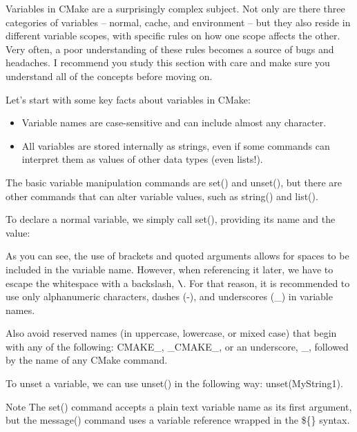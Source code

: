 
Variables in CMake are a surprisingly complex subject. Not only are there three categories of variables – normal, cache, and environment – but they also reside in different variable scopes, with specific rules on how one scope affects the other. Very often, a poor understanding of these rules becomes a source of bugs and headaches. I recommend you study this section with care and make sure you understand all of the concepts before moving on.

Let’s start with some key facts about variables in CMake:

\begin{itemize}
\item
Variable names are case-sensitive and can include almost any character.

\item
All variables are stored internally as strings, even if some commands can interpret them as values of other data types (even lists!).
\end{itemize}

The basic variable manipulation commands are set() and unset(), but there are other commands that can alter variable values, such as string() and list().

To declare a normal variable, we simply call set(), providing its name and the value:



As you can see, the use of brackets and quoted arguments allows for spaces to be included in the variable name. However, when referencing it later, we have to escape the whitespace with a backslash, $ \verb|\|$. For that reason, it is recommended to use only alphanumeric characters, dashes (-), and underscores (\_) in variable names.

Also avoid reserved names (in uppercase, lowercase, or mixed case) that begin with any of the following: CMAKE\_, \_CMAKE\_, or an underscore, \_, followed by the name of any CMake command.

To unset a variable, we can use unset() in the following way: unset(MyString1).

\begin{myNotic}{Note}
The set() command accepts a plain text variable name as its first argument, but the message() command uses a variable reference wrapped in the \$\{\} syntax.
\end{myNotic}

